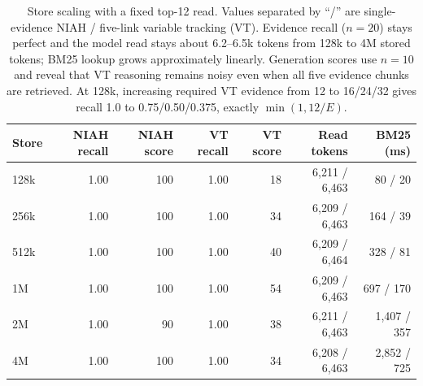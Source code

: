 \begin{table}[!t]
\centering
\small
\setlength{\tabcolsep}{4pt}
\begin{tabular}{@{}lrrrrrr@{}}
\toprule
\textbf{Store} & \textbf{NIAH recall} & \textbf{NIAH score} & \textbf{VT recall} & \textbf{VT score} & \textbf{Read tokens} & \textbf{BM25 (ms)} \\
\midrule
128k & 1.00 & 100 & 1.00 & 18 & 6,211 / 6,463 & 80 / 20 \\
256k & 1.00 & 100 & 1.00 & 34 & 6,209 / 6,463 & 164 / 39 \\
512k & 1.00 & 100 & 1.00 & 40 & 6,209 / 6,464 & 328 / 81 \\
1M   & 1.00 & 100 & 1.00 & 54 & 6,209 / 6,463 & 697 / 170 \\
2M   & 1.00 & 90  & 1.00 & 38 & 6,211 / 6,463 & 1,407 / 357 \\
4M   & 1.00 & 100 & 1.00 & 34 & 6,208 / 6,463 & 2,852 / 725 \\
\bottomrule
\end{tabular}
\caption{Store scaling with a fixed top-12 read. Values separated by ``/'' are
single-evidence NIAH / five-link variable tracking (VT). Evidence recall
($n{=}20$) stays perfect and the model read stays about 6.2--6.5k tokens from
128k to 4M stored tokens; BM25 lookup grows approximately linearly. Generation
scores use $n{=}10$ and reveal that VT reasoning remains noisy even when all
five evidence chunks are retrieved. At 128k, increasing required VT evidence
from 12 to 16/24/32 gives recall 1.0 to 0.75/0.50/0.375, exactly
$\min(1,12/E)$.}
\label{tab:store-scaling}
\end{table}
